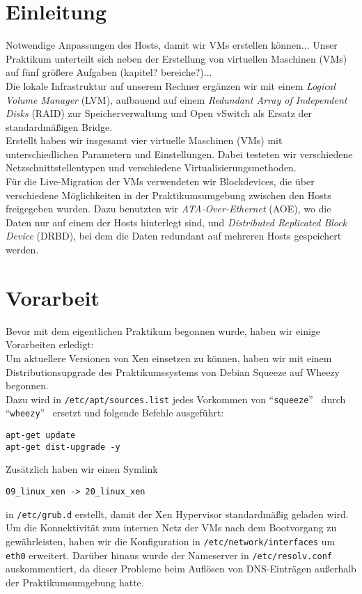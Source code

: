 \chapter{Einleitung}
Notwendige Anpassungen des Hosts, damit wir VMs erstellen können...
Unser Praktikum unterteilt sich neben der Erstellung von virtuellen Maschinen (VMs) auf fünf größere Aufgaben (kapitel? bereiche?)... \\
Die lokale Infrastruktur auf unserem Rechner ergänzen wir mit einem \emph{Logical Volume Manager} (LVM), aufbauend auf einem \emph{Redundant Array of Independent Disks} (RAID) zur Speicherverwaltung und Open vSwitch als Ersatz der standardmäßigen Bridge. \\
Erstellt haben wir insgesamt vier virtuelle Maschinen (VMs) mit unterschiedlichen Parametern und Einstellungen. Dabei testeten wir verschiedene Netzschnittstellentypen und verschiedene Virtualisierungsmethoden. \\
Für die Live-Migration der VMs verwendeten wir Blockdevices, die über verschiedene Möglichkeiten in der Praktikumsumgebung zwischen den Hosts freigegeben wurden. Dazu benutzten wir \emph{ATA-Over-Ethernet} (AOE), wo die Daten nur auf einem der Hosts hinterlegt sind, und \emph{Distributed Replicated Block Device} (DRBD), bei dem die Daten redundant auf mehreren Hosts gespeichert werden. 
\chapter{Vorarbeit}
\label{chap:whezzy_ugprade}
Bevor mit dem eigentlichen Praktikum begonnen wurde, haben wir einige Vorarbeiten erledigt: \\ 
Um aktuellere Versionen von Xen einsetzen zu können, haben wir mit einem Distributionsupgrade des Praktikumssystems von Debian Squeeze auf Wheezy begonnen. \\ 
Dazu wird in \verb#/etc/apt/sources.list# jedes Vorkommen von \textquotedblleft\verb#squeeze#\textquotedblright ~ durch \textquotedblleft\verb#wheezy#\textquotedblright ~ ersetzt und folgende Befehle ausgeführt: 

\begin{verbatim}
apt-get update
apt-get dist-upgrade -y
\end{verbatim}
Zusätzlich haben wir einen Symlink 
\setupVerbatimOut 
\begin{verbatim} 
09_linux_xen -> 20_linux_xen 
\end{verbatim} 
in \verb#/etc/grub.d# erstellt, damit der Xen Hypervisor standardmäßig geladen wird.
\\
Um die Konnektivität zum internen Netz der VMs nach dem Bootvorgang zu gewährleisten, haben wir die Konfiguration in \verb#/etc/network/interfaces# um \verb#eth0# erweitert. Darüber hinaus wurde der Nameserver in \verb#/etc/resolv.conf# auskommentiert, da dieser Probleme beim Auflösen von DNS-Einträgen außerhalb der Praktikumsumgebung hatte.

